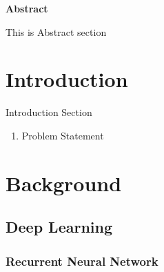 \documentclass[12pt]{article}
\begin{document}
\maketitle

\begin{center}
\textbf{Abstract}
\end{center}
\noindent
This is Abstract section


\section{Introduction}
Introduction Section
\begin{enumerate}
\item Problem Statement
\end{enumerate}


\section{Background}




\subsection{Deep Learning}

\subsubsection{Recurrent Neural Network}
\end{document}
